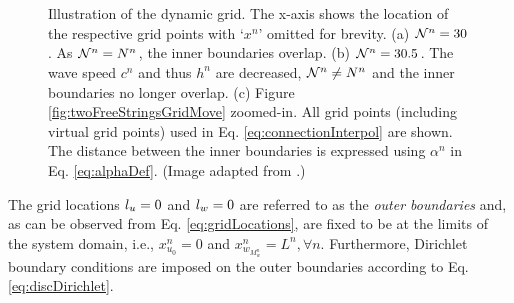 \documentclass[fleqn]{jaes}
\begin{document}
\begin{figure}[t]
    \centering
    \\
    \vspace{-1em}\\
    \vspace{-1em}
    \vspace{-1em}\caption{Illustration of the dynamic grid. The x-axis shows the location of the respective grid points with `$x^n$' omitted for brevity. 
    (a) $\mathcal{N}^n = 30$. As $\mathcal{N}^n = N^n$, the inner boundaries overlap. (b) $\mathcal{N}^n = 30.5$. The wave speed $c^n$ and thus $h^n$ are decreased, $\mathcal{N}^n \neq N^n$ and the inner boundaries no longer overlap. (c) Figure \ref{fig:twoFreeStringsGridMove} zoomed-in. All grid points (including virtual grid points) used in Eq. \eqref{eq:connectionInterpol} are shown. The distance between the inner boundaries is expressed using $\alpha^n$ in Eq. \eqref{eq:alphaDef}. (Image adapted from \cite{Willemsen2021a}.)}
\end{figure}
The grid locations ${l_u} = 0$ and ${l_w} = 0$ are referred to as the \textit{outer boundaries} and, as can be observed from Eq. \eqref{eq:gridLocations}, are fixed to be at the limits of the system domain, i.e., $x_{u_0}^n = 0$ and $x_{w_{M_w^n}}^n = L^n, \forall n$. Furthermore, Dirichlet boundary conditions are imposed on the outer boundaries according to Eq. \eqref{eq:discDirichlet}. 
\end{document}
